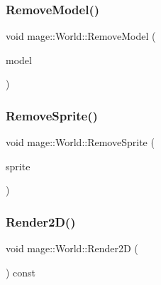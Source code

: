 \hypertarget{classmage_1_1_world_a14a4c76bc0c0806166e4cc713c404211}{}\label{classmage_1_1_world_a14a4c76bc0c0806166e4cc713c404211} 
\subsubsection{\texorpdfstring{Remove\+Model()}{RemoveModel()}}
{\footnotesize\ttfamily void mage\+::\+World\+::\+Remove\+Model (\begin{DoxyParamCaption}\item[{\hyperlink{namespacemage_a1e01ae66713838a7a67d30e44c67703e}{Shared\+Ptr}$<$ \hyperlink{namespacemage_a3086b6de2ec7ebd59d8b0bdc57195760}{Model\+Node} $>$}]{model }\end{DoxyParamCaption})\hspace{0.3cm}{\ttfamily [private]}}

\hypertarget{classmage_1_1_world_a78bb790257c3a03ccb6829859230b4c7}{}\label{classmage_1_1_world_a78bb790257c3a03ccb6829859230b4c7} 
\subsubsection{\texorpdfstring{Remove\+Sprite()}{RemoveSprite()}}
{\footnotesize\ttfamily void mage\+::\+World\+::\+Remove\+Sprite (\begin{DoxyParamCaption}\item[{\hyperlink{namespacemage_a1e01ae66713838a7a67d30e44c67703e}{Shared\+Ptr}$<$ \hyperlink{classmage_1_1_sprite_object}{Sprite\+Object} $>$}]{sprite }\end{DoxyParamCaption})\hspace{0.3cm}{\ttfamily [private]}}

\hypertarget{classmage_1_1_world_a49e7adf01a415aefc911d69c6fcee665}{}\label{classmage_1_1_world_a49e7adf01a415aefc911d69c6fcee665} 
\subsubsection{\texorpdfstring{Render2\+D()}{Render2D()}}
{\footnotesize\ttfamily void mage\+::\+World\+::\+Render2D (\begin{DoxyParamCaption}{ }\end{DoxyParamCaption}) const}

